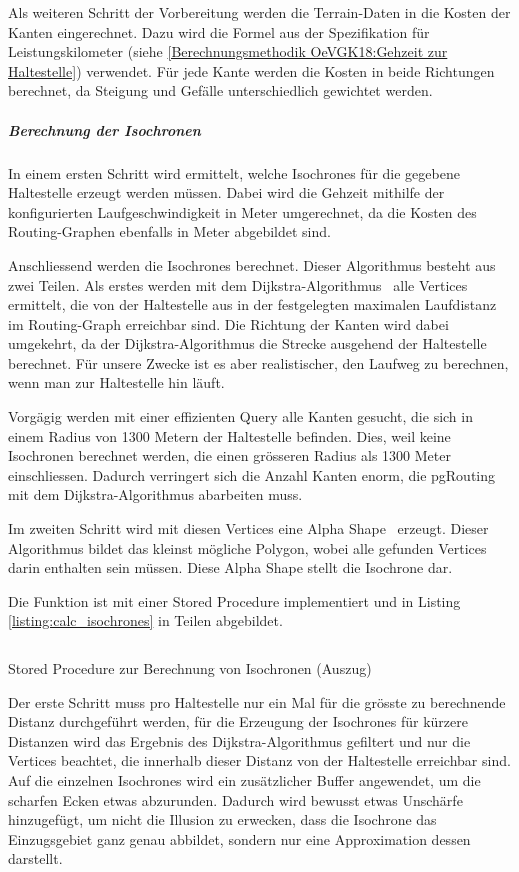 Als weiteren Schritt der Vorbereitung werden die Terrain-Daten in die Kosten der Kanten eingerechnet.
Dazu wird die Formel aus der Spezifikation für Leistungskilometer (siehe \ref{Berechnungsmethodik OeVGK18:Gehzeit zur Haltestelle}) verwendet.
Für jede Kante werden die Kosten in beide Richtungen berechnet, da Steigung und Gefälle unterschiedlich gewichtet werden.

\subparagraph{Berechnung der Isochronen}
In einem ersten Schritt wird ermittelt, welche \glspl{Isochrone} für die gegebene Haltestelle erzeugt werden müssen.
Dabei wird die Gehzeit mithilfe der konfigurierten Laufgeschwindigkeit in Meter umgerechnet, da die Kosten des Routing-Graphen ebenfalls in Meter abgebildet sind.

Anschliessend werden die \glspl{Isochrone} berechnet.
Dieser Algorithmus besteht aus zwei Teilen.
Als erstes werden mit dem Dijkstra-Algorithmus~\cite{dijkstra_algorithm} alle Vertices ermittelt, die von der Haltestelle aus in der festgelegten maximalen Laufdistanz im Routing-Graph erreichbar sind.
Die Richtung der Kanten wird dabei umgekehrt, da der Dijkstra-Algorithmus die Strecke ausgehend der Haltestelle berechnet.
Für unsere Zwecke ist es aber realistischer, den Laufweg zu berechnen, wenn man zur Haltestelle hin läuft.

Vorgägig werden mit einer effizienten Query alle Kanten gesucht, die sich in einem Radius von 1300 Metern der Haltestelle befinden.
Dies, weil keine Isochronen berechnet werden, die einen grösseren Radius als 1300 Meter einschliessen.
Dadurch verringert sich die Anzahl Kanten enorm, die pgRouting mit dem Dijkstra-Algorithmus abarbeiten muss.

Im zweiten Schritt wird mit diesen Vertices eine Alpha Shape~\cite{alpha_shapes} erzeugt. Dieser Algorithmus bildet das kleinst mögliche Polygon, wobei alle gefunden Vertices darin enthalten sein müssen.
Diese Alpha Shape stellt die \gls{Isochrone} dar.

Die Funktion ist mit einer Stored Procedure implementiert und in Listing \ref{listing:calc_isochrones} in Teilen abgebildet.

\begin{listing}[ht]
    \inputminted{sql}{projectdoc/listing/calc_isochrones.sql}
    \caption{Stored Procedure zur Berechnung von Isochronen (Auszug)}
    \label{listing:calc_isochrones}
\end{listing}

Der erste Schritt muss pro Haltestelle nur ein Mal für die grösste zu berechnende Distanz durchgeführt werden, für die Erzeugung der \glspl{Isochrone} für kürzere Distanzen wird das Ergebnis des Dijkstra-Algorithmus gefiltert und nur die Vertices beachtet, die innerhalb dieser Distanz von der Haltestelle erreichbar sind.
Auf die einzelnen \glspl{Isochrone} wird ein zusätzlicher Buffer angewendet, um die scharfen Ecken etwas abzurunden.
Dadurch wird bewusst etwas Unschärfe hinzugefügt, um nicht die Illusion zu erwecken, dass die \gls{Isochrone} das Einzugsgebiet ganz genau abbildet, sondern nur eine Approximation dessen darstellt.

